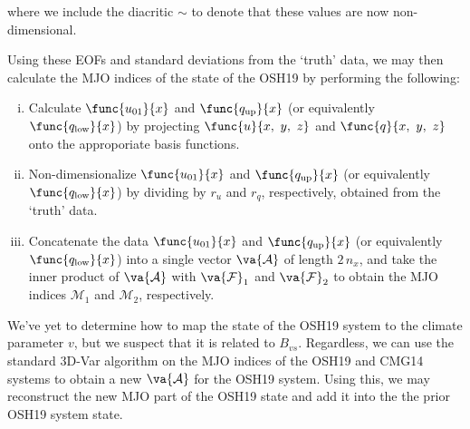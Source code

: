 where we include the diacritic $\sim$ to denote that these values are now non-dimensional. 

Using these EOFs and standard deviations from the `truth' data, we may then calculate the MJO indices of the state of the OSH19 by performing the following:
\begin{enumerate}[(i)]
	\item Calculate $\func{u_{01}}{x}$ and $\func{q_{\text{up}}}{x}$ (or equivalently $\func{q_{\text{low}}}{x}$) by projecting $\func{u}{x,\ y,\ z}$ and $\func{q}{x,\ y,\ z}$ onto the approporiate basis functions.
	\item Non-dimensionalize $\func{u_{01}}{x}$ and $\func{q_{\text{up}}}{x}$ (or equivalently $\func{q_{\text{low}}}{x}$) by dividing by $r_u$ and $r_q$, respectively, obtained from the `truth' data.
	\item Concatenate the data $\func{u_{01}}{x}$ and $\func{q_{\text{up}}}{x}$ (or equivalently $\func{q_{\text{low}}}{x}$) into a single vector $\va{\mathcal{A}}$ of length $2\,n_x$, and take the inner product of $\va{\mathcal{A}}$ with $\va{\mathcal{F}}_1$ and $\va{\mathcal{F}}_2$ to obtain the MJO indices $\mathcal{M}_1$ and $\mathcal{M}_2$, respectively.
\end{enumerate}

We've yet to determine how to map the state of the OSH19 system to the climate parameter $v$, but we suspect that it is related to $B_{vs}$. Regardless, we can use the standard 3D-Var algorithm on the MJO indices of the OSH19 and CMG14 systems to obtain a new $\va{\mathcal{A}}$ for the OSH19 system. Using this, we may reconstruct the new MJO part of the OSH19 state and add it into the the prior OSH19 system state.